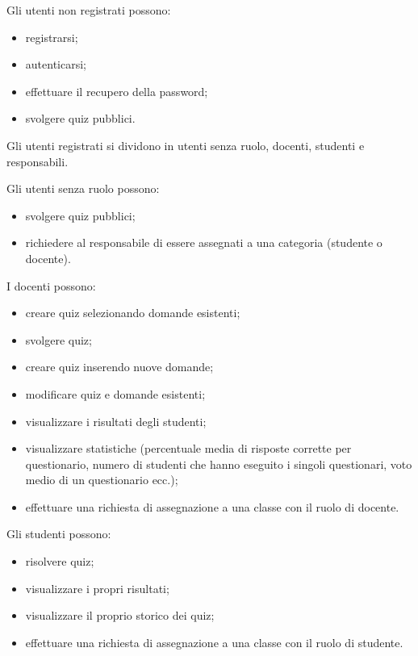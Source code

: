 \documentclass[a4paper, titlepage]{article}
\begin{document}
\bigskip

Gli utenti non registrati possono: 
\begin{itemize}
\item registrarsi;
\item autenticarsi;
\item effettuare il recupero della password;
\item svolgere quiz pubblici.
\end{itemize}

\bigskip

Gli utenti registrati si dividono in utenti senza ruolo, docenti, studenti e responsabili. 

\bigskip

Gli utenti senza ruolo possono:
\begin{itemize}
	\item svolgere quiz pubblici;
	\item richiedere al responsabile di essere assegnati a una categoria (studente o docente).
\end{itemize}

\bigskip

I docenti possono:
\begin{itemize}
\item creare quiz selezionando domande esistenti;
\item svolgere quiz;
\item creare quiz inserendo nuove domande;
\item modificare quiz  e domande esistenti;
\item visualizzare i risultati degli studenti;
\item visualizzare statistiche (percentuale media di risposte corrette per questionario, numero di studenti che hanno eseguito i singoli questionari, voto medio di un questionario ecc.);
\item effettuare una richiesta di assegnazione a una classe con il ruolo di docente.
\end{itemize}

\bigskip

Gli studenti possono:
\begin{itemize}
\item risolvere quiz;
\item visualizzare i propri risultati;
\item visualizzare il proprio storico dei quiz;
\item effettuare una richiesta di assegnazione a una classe con il ruolo di studente.
\end{itemize}
\end{document}
